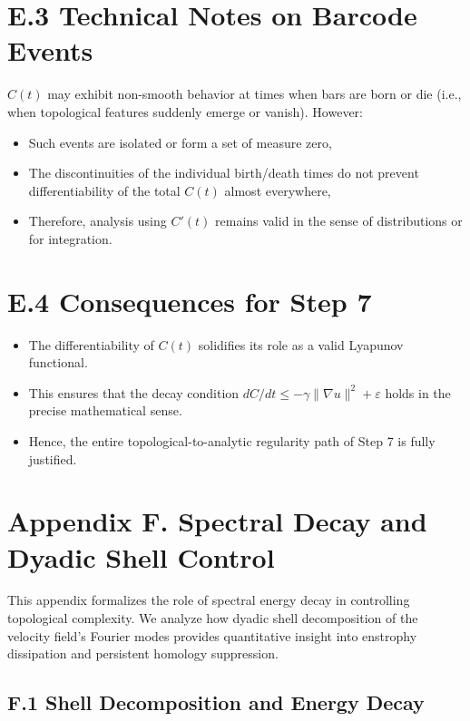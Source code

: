 \documentclass[11pt]{article}
\theoremstyle{definition}
\begin{document}
\section*{E.3 Technical Notes on Barcode Events}
$C(t)$ may exhibit non-smooth behavior at times when bars are born or die (i.e., when topological features suddenly emerge or vanish). However:
\begin{itemize}
  \item Such events are isolated or form a set of measure zero,
  \item The discontinuities of the individual birth/death times do not prevent differentiability of the total $C(t)$ almost everywhere,
  \item Therefore, analysis using $C'(t)$ remains valid in the sense of distributions or for integration.
\end{itemize}

\section*{E.4 Consequences for Step 7}
\begin{itemize}
  \item The differentiability of $C(t)$ solidifies its role as a valid Lyapunov functional.
  \item This ensures that the decay condition $dC/dt \leq -\gamma \|\nabla u\|^2 + \varepsilon$ holds in the precise mathematical sense.
  \item Hence, the entire topological-to-analytic regularity path of Step 7 is fully justified.
\end{itemize}


\section*{Appendix F. Spectral Decay and Dyadic Shell Control}

This appendix formalizes the role of spectral energy decay in controlling topological complexity. We
analyze how dyadic shell decomposition of the velocity field’s Fourier modes provides quantitative
insight into enstrophy dissipation and persistent homology suppression.

\subsection*{F.1 Shell Decomposition and Energy Decay}
\end{document}
